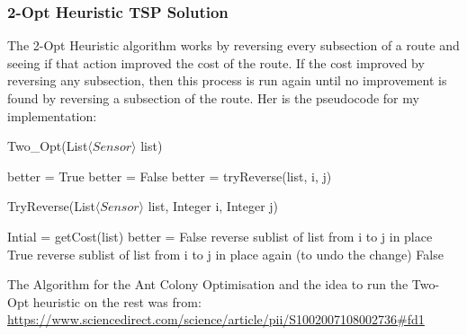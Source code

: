 \documentclass[12pt]{article}
\begin{document}
\subsubsection{2-Opt Heuristic TSP Solution}
The 2-Opt Heuristic algorithm works by reversing every subsection of a route and seeing if that action improved the cost of the route. If the cost improved by reversing any subsection, then this process is run again until no improvement is found by reversing a subsection of the route. Her is the pseudocode for my implementation:
\begin{algorithm}
\caption{Two\_Opt(List$\langle Sensor \rangle$ list)}
\begin{algorithmic}
 \STATE better = True
 \STATE better = False
 \STATE better = tryReverse(list, i, j)
 \ENDFOR
 \ENDFOR
 \ENDWHILE
\end{algorithmic}
\end{algorithm}
\begin{algorithm}
\caption{TryReverse(List$\langle Sensor \rangle$ list, Integer i, Integer j)}
\begin{algorithmic}
 \STATE Intial = getCost(list)
 \STATE better = False
 \STATE reverse sublist of list from i to j in place
 \RETURN True
 \ENDIF
 \STATE reverse sublist of list from i to j in place again (to undo the change)
 \RETURN False
 \ENDWHILE
\end{algorithmic}
\end{algorithm}
The Algorithm for the Ant Colony Optimisation and the idea to run the Two-Opt heuristic on the rest was from:
\url{https://www.sciencedirect.com/science/article/pii/S1002007108002736#fd1}
\newpage
\end{document}
